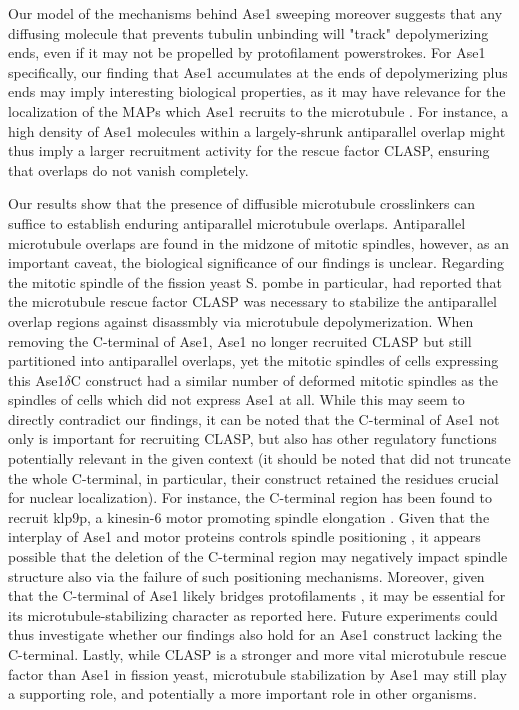 Our model of the mechanisms behind Ase1 sweeping moreover suggests that any diffusing molecule that prevents tubulin unbinding will "track" depolymerizing ends, even if it may not be propelled by protofilament powerstrokes. For Ase1 specifically, our finding that Ase1 accumulates at the ends of depolymerizing plus ends may imply interesting biological properties, as it may have relevance for the localization of the MAPs which Ase1 recruits to the microtubule . For instance, a high density of Ase1 molecules within a largely-shrunk antiparallel overlap might thus imply a larger recruitment activity for the rescue factor CLASP, ensuring that overlaps do not vanish completely. \par
 
Our results show that the presence of diffusible microtubule crosslinkers can suffice to establish enduring antiparallel microtubule overlaps. Antiparallel microtubule overlaps are found in the midzone of mitotic spindles, however, as an important caveat, the biological significance of our findings is unclear. Regarding the mitotic spindle of the fission yeast S. pombe in particular, \cite{Bratman2007b} had reported that the microtubule rescue factor CLASP was necessary to stabilize the antiparallel overlap regions against disassmbly via microtubule depolymerization. When removing the C-terminal of Ase1, Ase1 no longer recruited CLASP but still partitioned into antiparallel overlaps, yet the mitotic spindles of cells expressing this Ase1$\delta$C construct had a similar number of deformed mitotic spindles as the spindles of cells which did not express Ase1 at all. While this may seem to directly contradict our findings, it can be noted that the C-terminal of Ase1 not only is important for recruiting CLASP, but also has other regulatory functions potentially relevant in the given context (it should be noted that \cite{Bratman2007b} did not truncate the whole C-terminal, in particular, their construct retained the residues crucial for nuclear localization). For instance, the C-terminal region has been found to recruit klp9p, a kinesin-6 motor promoting spindle elongation . Given that the interplay of Ase1 and motor proteins controls spindle positioning , it appears possible that the deletion of the C-terminal region may negatively impact spindle structure also via the failure of such positioning mechanisms. Moreover, given that the C-terminal of Ase1 likely bridges protofilaments , it may be essential for its microtubule-stabilizing character as reported here. Future experiments could thus investigate whether our findings also hold for an Ase1 construct lacking the C-terminal. Lastly, while CLASP is a stronger and more vital microtubule rescue factor than Ase1 in fission yeast, microtubule stabilization by Ase1 may still play a supporting role, and potentially a more important role in other organisms. \par

